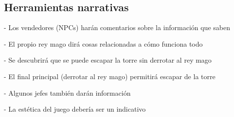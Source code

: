 \subsection{Herramientas narrativas}%



- Los vendedores (NPCs) harán comentarios sobre la información que saben

- El propio rey mago dirá cosas relacionadas a cómo funciona todo

- Se descubrirá que se puede escapar la torre sin derrotar al rey mago

- El final principal (derrotar al rey mago) permitirá escapar de la torre

- Algunos jefes también darán información

- La estética del juego debería ser un indicativo